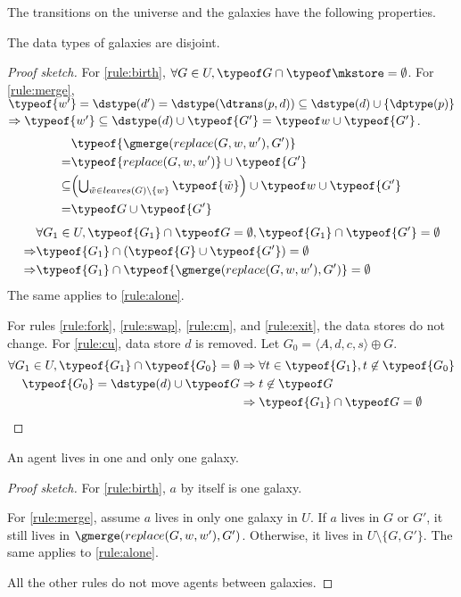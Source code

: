 The transitions on the universe and the galaxies have the following properties. 

\begin{proposition}
The data types of galaxies are disjoint.
\end{proposition}
\begin{proof}[Proof sketch]
For \ref{rule:birth}, $\forall G\in U, \typeof G \cap \typeof\mkstore = \emptyset$.
%
For \ref{rule:merge}, %
$\typeof{w'}=\dstype(d')=\dstype(\dtrans(p,d))\subseteq\dstype(d)\cup\{\dptype(p)\}$
$\Rightarrow \typeof{w'}\subseteq\dstype(d)\cup\typeof{G'}=\typeof w\cup\typeof{G'}$. 
\begin{align*}
    & \typeof{\gmerge(replace(G,w,w'),G')} \\
  = & \typeof{replace(G,w,w')}\cup\typeof{G'} \\
  \subseteq & {\textstyle\left(\bigcup_{\tilde w \in leaves(G)\setminus\{w\}} \typeof{\tilde w}\right)} \cup \typeof w\cup\typeof{G'} \\
  = & \typeof G \cup \typeof{G'}
\end{align*}
\begin{align*}
  & \forall G_1\in U, \typeof{G_1}\cap\typeof G=\emptyset, \typeof{G_1}\cap\typeof{G'}=\emptyset  \\
  \Rightarrow & \typeof{G_1} \cap (\typeof{G}\cup\typeof{G'}) = \emptyset \\
  \Rightarrow & \typeof{G_1} \cap \typeof{\gmerge(replace(G,w,w'),G')} = \emptyset
\end{align*}
The same applies to \ref{rule:alone}. 

For rules \ref{rule:fork}, \ref{rule:swap}, \ref{rule:cm}, and \ref{rule:exit}, 
the data stores do not change. 
%
For \ref{rule:cu}, data store $d$ is removed. 
Let $G_0=\langle A,d,c,s\rangle\oplus G$.
\begin{align*}
  \forall G_1\in U, \typeof{G_1}\cap\typeof{G_0}=\emptyset
  & \Rightarrow \forall t\in\typeof{G_1}, t\not\in\typeof{G_0} \\
  \typeof{G_0}=\dstype(d)\cup\typeof G
  & \Rightarrow t\not\in\typeof G \\
  & \Rightarrow \typeof{G_1}\cap\typeof G=\emptyset
\end{align*}
\end{proof}

\begin{proposition}
An agent lives in one and only one galaxy.
\end{proposition}
\begin{proof}[Proof sketch]
For \ref{rule:birth}, $a$ by itself is one galaxy.

For \ref{rule:merge}, assume $a$ lives in only one galaxy in $U$. 
If $a$ lives in $G$ or $G'$, it still lives in $\gmerge(replace(G,w,w'),G')$.
Otherwise, it lives in $U\setminus\{G,G'\}$.
The same applies to \ref{rule:alone}. 

All the other rules do not move agents between galaxies. 
\end{proof}


